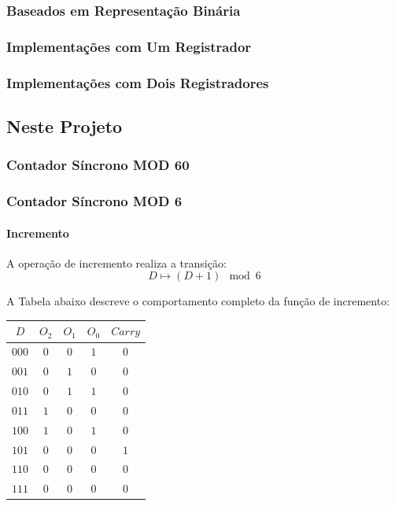 \documentclass[a4paper,12pt]{article}
\begin{document}
\subsubsection{Baseados em Representação Binária}

\subsubsection{Implementações com Um Registrador}

\subsubsection{Implementações com Dois Registradores}

\subsection {Neste Projeto}

\subsubsection{Contador Síncrono MOD 60}

\subsubsection{Contador Síncrono MOD 6}

\paragraph{Incremento}

A operação de incremento realiza a transição:
\[
D \mapsto (D + 1) \mod 6
\]


A Tabela abaixo descreve o comportamento completo da função de incremento:

\begin{center}
\begin{tabular}{c|cccc}
$D$ & $O_2$ & $O_1$ & $O_0$ & $Carry$\\
\hline
$000$ & $0$ & $0$ & $1$ & $0$\\
$001$ & $0$ & $1$ & $0$ & $0$\\
$010$ & $0$ & $1$ & $1$ & $0$\\
$011$ & $1$ & $0$ & $0$ & $0$\\
$100$ & $1$ & $0$ & $1$ & $0$\\
$101$ & $0$ & $0$ & $0$ & $1$\\
$110$ & $0$ & $0$ & $0$ & $0$\\
$111$ & $0$ & $0$ & $0$ & $0$\\
\end{tabular}
\end{center}
\end{document}
